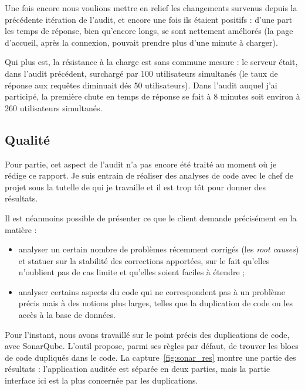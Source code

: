Une fois encore nous voulions mettre en relief les changements survenus depuis la précédente itération de l'audit, et encore une fois ils étaient positifs : d'une part les temps de réponse, bien qu'encore longs, se sont nettement améliorés (la page d'accueil, après la connexion, pouvait prendre plus d'une minute à charger).

Qui plus est, la résistance à la charge est sans commune mesure : le serveur était, dans l'audit précédent, surchargé par 100 utilisateurs simultanés (le taux de réponse aux requêtes diminuait dés 50 utilisateurs). Dans l'audit auquel j'ai participé, la première chute en temps de réponse se fait à 8 minutes soit environ à 260 utilisateurs simultanés. 

\subsection{Qualité}
Pour partie, cet aspect de l'audit n'a pas encore été traité au moment où je rédige ce rapport. Je suis entrain de réaliser des analyses de code avec le chef de projet sous la tutelle de qui je travaille et il est trop tôt pour donner des résultats. 

Il est néanmoins possible de présenter ce que le client demande précisément en la matière :
\begin{itemize}
  \item analyser un certain nombre de problèmes récemment corrigés (les \emph{root causes}) et statuer sur la stabilité des corrections apportées, sur le fait qu'elles n'oublient pas de cas limite et qu'elles soient faciles à étendre ;
  \item analyser certains aspects du code qui ne correspondent pas à un problème précis mais à des notions plus larges, telles que la duplication de code ou les accès à la base de données. 
\end{itemize}

Pour l'instant, nous avons travaillé sur le point précis des duplications de code, avec SonarQube. L'outil propose, parmi ses règles par défaut, de trouver les blocs de code dupliqués dans le code. La capture~\ref{fig:sonar_res} montre une partie des résultats : l'application auditée est séparée en deux parties, mais la partie \og interface \fg{} ici est la plus concernée par les duplications. 

